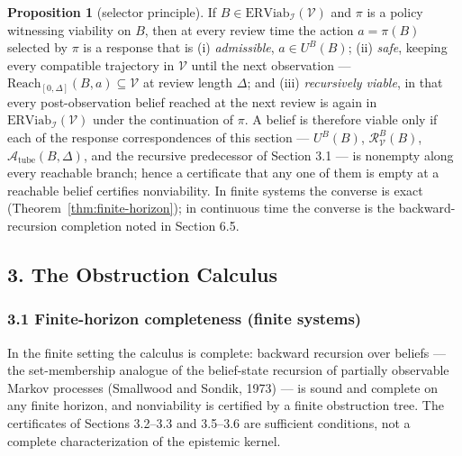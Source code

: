 \documentclass[10pt,twocolumn]{article}
\theoremstyle{definition}
\newtheorem{proposition}{Proposition}
\begin{document}
\begin{proposition}[selector principle]\label{prop:selector}
If \(B\in\mathrm{ERViab}_{\mathcal{I}}(\mathcal{V})\) and \(\pi\) is a
policy witnessing viability on \(B\), then at every review time the
action \(a=\pi(B)\) selected by \(\pi\) is a response that is
(i) \emph{admissible}, \(a\in U^B(B)\); (ii) \emph{safe}, keeping every
compatible trajectory in \(\mathcal{V}\) until the next observation ---
\(\mathrm{Reach}_{[0,\Delta]}(B,a)\subseteq\mathcal{V}\) at review
length \(\Delta\); and (iii) \emph{recursively viable}, in that every
post-observation belief reached at the next review is again in
\(\mathrm{ERViab}_{\mathcal{I}}(\mathcal{V})\) under the continuation
of \(\pi\). A belief is therefore viable only if each of the response
correspondences of this section --- \(U^B(B)\),
\(\mathcal{R}_{\mathcal{V}}^B(B)\), \(\mathcal{A}_{\mathrm{tube}}(B,\Delta)\),
and the recursive predecessor of Section 3.1 --- is nonempty along
every reachable branch; hence a certificate that any one of them is
empty at a reachable belief certifies nonviability. In finite systems
the converse is exact (Theorem~\ref{thm:finite-horizon}); in continuous
time the converse is the backward-recursion completion noted in
Section 6.5.
\end{proposition}



\subsection{3. The Obstruction Calculus}\label{the-obstruction-calculus}

\subsubsection{3.1 Finite-horizon completeness (finite systems)}\label{finite-horizon-completeness}

In the finite setting the calculus is complete: backward recursion over beliefs --- the set-membership analogue of the belief-state recursion of partially observable Markov processes (Smallwood and Sondik, 1973) --- is sound and complete on any finite horizon, and nonviability is certified by a finite obstruction tree. The certificates of Sections 3.2--3.3 and 3.5--3.6 are sufficient conditions, not a complete characterization of the epistemic kernel.
\end{document}
